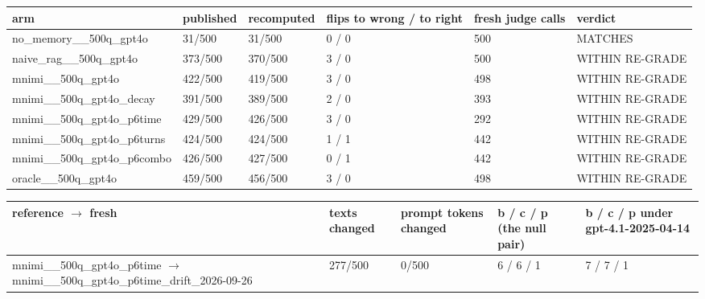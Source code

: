 \begin{tabular}{llllll}
\toprule
arm & published & recomputed & flips to wrong / to right & fresh judge calls & verdict \\
\midrule
no\_memory\_\_500q\_gpt4o & 31/500 & 31/500 & 0 / 0 & 500 & MATCHES \\
naive\_rag\_\_500q\_gpt4o & 373/500 & 370/500 & 3 / 0 & 500 & WITHIN RE-GRADE \\
mnimi\_\_500q\_gpt4o & 422/500 & 419/500 & 3 / 0 & 498 & WITHIN RE-GRADE \\
mnimi\_\_500q\_gpt4o\_decay & 391/500 & 389/500 & 2 / 0 & 393 & WITHIN RE-GRADE \\
mnimi\_\_500q\_gpt4o\_p6time & 429/500 & 426/500 & 3 / 0 & 292 & WITHIN RE-GRADE \\
mnimi\_\_500q\_gpt4o\_p6turns & 424/500 & 424/500 & 1 / 1 & 442 & WITHIN RE-GRADE \\
mnimi\_\_500q\_gpt4o\_p6combo & 426/500 & 427/500 & 0 / 1 & 442 & WITHIN RE-GRADE \\
oracle\_\_500q\_gpt4o & 459/500 & 456/500 & 3 / 0 & 498 & WITHIN RE-GRADE \\
\bottomrule
\end{tabular}

\begin{tabular}{lllll}
\toprule
reference $\rightarrow$ fresh & texts changed & prompt tokens changed & b / c / p (the null pair) & b / c / p under gpt-4.1-2025-04-14 \\
\midrule
mnimi\_\_500q\_gpt4o\_p6time $\rightarrow$ mnimi\_\_500q\_gpt4o\_p6time\_drift\_2026-09-26 & 277/500 & 0/500 & 6 / 6 / 1 & 7 / 7 / 1 \\
\bottomrule
\end{tabular}

